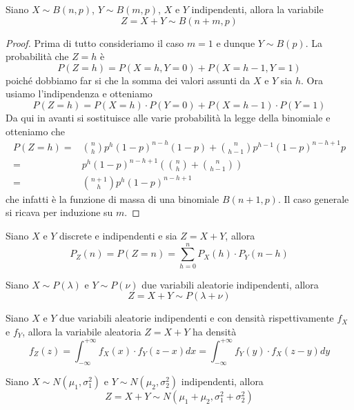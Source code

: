 \begin{proposition}
	Siano $X \sim B(n, p)$, $Y \sim B(m, p)$, $X$ e $Y$ indipendenti, allora la variabile
	\[ Z = X + Y \sim B(n + m, p) \]
	\begin{proof}
		Prima di tutto consideriamo il caso $m = 1$ e dunque $Y \sim B(p)$. La probabilità che
		$Z = h$ è
		\[ P(Z = h) = P(X = h, Y = 0) + P(X = h-1, Y = 1) \]
		poiché dobbiamo far si che la somma dei valori assunti da $X$ e $Y$ sia $h$. Ora usiamo
		l'indipendenza e otteniamo
		\[ P(Z = h) = P(X = h) \cdot P(Y = 0) + P(X = h-1) \cdot P(Y = 1) \]
		Da qui in avanti si sostituisce alle varie probabilità la legge della binomiale e otteniamo
		che
		\begin{align*}
			P(Z = h) = & \binom{n}{h} p^h (1-p)^{n-h} (1-p) +
			\binom{n}{h-1} p^{h-1} (1-p)^{n-h+1} p                                    \\
			=          & p^h (1-p)^{n-h+1} \left(\binom{n}{h} + \binom{n}{h-1}\right) \\
			=          & \binom{n+1}{h} p^h (1-p)^{n-h+1}
		\end{align*}
		che infatti è la funzione di massa di una binomiale $B(n + 1, p)$. Il caso generale si
		ricava per induzione su $m$.
	\end{proof}
\end{proposition}

\begin{proposition}
	Siano $X$ e $Y$ discrete e indipendenti e sia $Z = X + Y$, allora
	\[ P_Z(n) = P(Z = n) = \sum_{h=0}^n P_X(h) \cdot P_Y(n-h) \]
\end{proposition}

\begin{proposition}
	Siano $X \sim P(\lambda)$ e $Y \sim P(\nu)$ due variabili aleatorie indipendenti, allora
	\[ Z = X+Y \sim P(\lambda + \nu) \]
\end{proposition}

\begin{proposition}[Convoluzione]
	Siano $X$ e $Y$ due variabili aleatorie indipendenti e con densità rispettivamente $f_X$ e
	$f_Y$, allora la variabile aleatoria $Z = X + Y$ ha densità
	\[
		f_Z (z) = \int_{-\infty}^{+\infty} f_X (x) \cdot f_Y (z - x) dx =
		\int_{-\infty}^{+\infty} f_Y (y) \cdot f_X (z - y) dy
	\]
\end{proposition}

\begin{proposition}\label{prop: riprod_gauss}
	Siano $X \sim N(\mu_1, \sigma_1^2)$ e $Y \sim N(\mu_2, \sigma_2^2)$ indipendenti, allora
	\[ Z = X + Y \sim N(\mu_1 + \mu_2, \sigma_1^2 + \sigma_2^2) \]
\end{proposition}